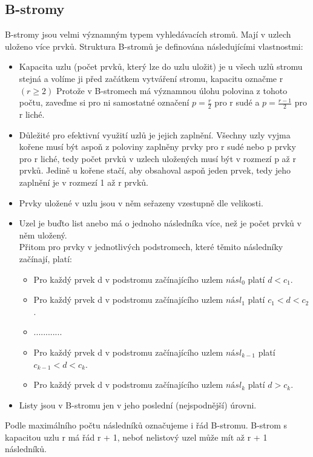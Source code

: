 \documentclass[10pt,a4paper]{article}
\begin{document}
\subsection{B-stromy}
B-stromy jsou velmi významným typem vyhledávacích stromů. Mají v uzlech uloženo více prvků. Struktura B-stromů je definována následujícími vlastnostmi:
\begin{itemize}
	\item Kapacita uzlu (počet prvků, který lze do uzlu uložit) je u všech uzlů stromu stejná a volíme ji před začátkem vytváření stromu, kapacitu označme r $(r \geq 2)$ Protože v B-stromech má významnou úlohu polovina z tohoto počtu, zaveďme si pro ni samostatné označení $p = \frac{r}{2}$ pro r sudé a $p = \frac{r-1}{2}$ pro r liché.
	\item Důležité pro efektivní využití uzlů je jejich zaplnění. Všechny uzly vyjma kořene musí být aspoň z poloviny zaplněny prvky pro r sudé nebo p prvky pro r liché, tedy počet prvků v uzlech uložených musí být v rozmezí p až r prvků. Jedině u kořene stačí, aby obsahoval aspoň jeden prvek, tedy jeho zaplnění je v rozmezí 1 až r prvků.
	\item Prvky uložené v uzlu jsou v něm seřazeny vzestupně dle velikosti.
	\item Uzel je buďto list anebo má o jednoho následníka více, než je počet prvků v něm uložený. \\
	Přitom pro prvky v jednotlivých podstromech, které těmito následníky začínají, platí:
	\begin{itemize}
		\item Pro každý prvek d v podstromu začínajícího uzlem $násl_0$ platí $d < c_1$.
		\item Pro každý prvek d v podstromu začínajícího uzlem $násl_1$ platí $c_1 < d < c_2$.
		\item ............
		\item Pro každý prvek d v podstromu začínajícího uzlem $násl_{k-1}$ platí $c_{k-1} < d <c_k$.
		\item Pro každý prvek d v podstromu začínajícího uzlem $násl_k$ platí $d > c_k$.
	\end{itemize}
	\item Listy jsou v B-stromu jen v jeho poslední (nejspodnější) úrovni.
\end{itemize}
Podle maximálního počtu následníků označujeme i řád B-stromu. B-strom s kapacitou uzlu r má řád r + 1, neboť nelistový uzel může mít až r + 1 následníků.
\end{document}
